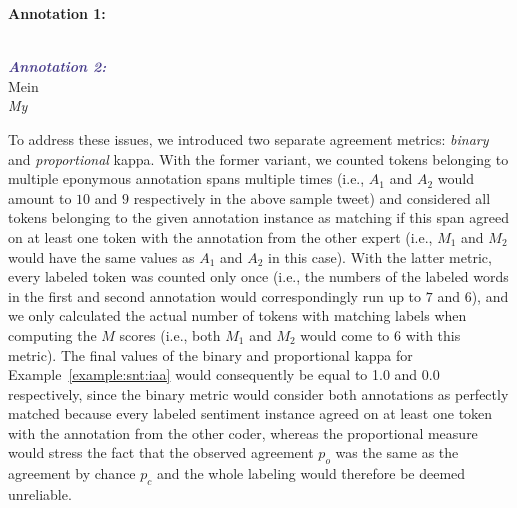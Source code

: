 \begin{example}\label{example:snt:iaa}
\textcolor{red3}{\textbf{Annotation 1:}}\\
\upshape{}\\

\noindent\textcolor{darkslateblue}{\textbf{\itshape Annotation 2:}}\\
Mein \\
\itshape My \upshape{}
\end{example}

To address these issues, we introduced two separate agreement metrics:
\emph{binary} and \emph{proportional} kappa.  With the former variant,
we counted tokens belonging to multiple eponymous annotation spans
multiple times (i.e., $A_1$ and $A_2$ would amount to $10$ and $9$
respectively in the above sample tweet) and considered all tokens
belonging to the given annotation instance as matching if this span
agreed on at least one token with the annotation from the other expert
(i.e., $M_1$ and $M_2$ would have the same values as $A_1$ and $A_2$
in this case).  With the latter metric, every labeled token was
counted only once (i.e., the numbers of the labeled words in the first
and second annotation would correspondingly run up to $7$ and $6$),
and we only calculated the actual number of tokens with matching
labels when computing the $M$ scores (i.e., both $M_1$ and $M_2$ would
come to $6$ with this metric).  The final values of the binary and
proportional kappa for Example~\ref{example:snt:iaa} would
consequently be equal to 1.0 and 0.0 respectively, since the binary
metric would consider both annotations as perfectly matched because
every labeled sentiment instance agreed on at least one token with the
annotation from the other coder, whereas the proportional measure
would stress the fact that the observed agreement $p_o$ was the same
as the agreement by chance $p_c$ and the whole labeling would
therefore be deemed unreliable.

